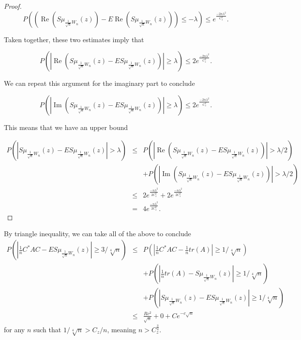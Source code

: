 \documentclass[12pt,a4paper,leqno]{report}
\renewcommand{\Re}{\operatorname{Re}}
\renewcommand{\Im}{\operatorname{Im}}
\theoremstyle{plain}
\theoremstyle{definition}
\theoremstyle{remark}
\begin{document}
\begin{proof}
\begin{equation*}
P\left((\Re(S\mu_{\frac{1}{\sqrt{n}}W_n}(z))-E\Re(S\mu_{\frac{1}{\sqrt{n}}W_n}(z))) \leq  -\lambda \right) \leq
e^{\frac{-2n\lambda^2}{C_z^2}}.
\end{equation*}

Taken together, these two estimates imply that

\begin{equation*}
P\left(|\Re(S\mu_{\frac{1}{\sqrt{n}}W_n}(z)-ES\mu_{\frac{1}{\sqrt{n}}W_n}(z))| \geq  \lambda \right)  \leq 2
e^{\frac{-2n\lambda^2}{C_z^2}}.
\end{equation*}

We can repeat this argument for the imaginary part to conclude

\begin{equation*}
P\left(|\Im(S\mu_{\frac{1}{\sqrt{n}}W_n}(z)-ES\mu_{\frac{1}{\sqrt{n}}W_n}(z))| \geq  \lambda \right)  \leq 2
e^{\frac{-2n\lambda^2}{C_z^2}}.
\end{equation*}

This means that we have an upper bound

\begin{eqnarray*}
P(|S\mu_{\frac{1}{\sqrt{n}}W_n}(z)- ES\mu_{\frac{1}{\sqrt{n}}W_n}(z)|>\lambda) & \leq &
P(|\Re(S\mu_{\frac{1}{\sqrt{n}}W_n}(z)- ES\mu_{\frac{1}{\sqrt{n}}W_n}(z))|>\lambda/2) \\ & &+ 
P(|\Im(S\mu_{\frac{1}{\sqrt{n}}W_n}(z)- ES\mu_{\frac{1}{\sqrt{n}}W_n}(z))|>\lambda/2)\\
& \leq & 2
e^{\frac{-n\lambda^2}{2C_z^2}} + 2
e^{\frac{-n\lambda^2}{2C_z^2}}\\
& = & 4
e^{\frac{-n\lambda^2}{2C_z^2}}.
\end{eqnarray*}

\end{proof}

By triangle inequality, we can take all of the above to conclude
\begin{eqnarray*}
P(|\frac{1}{n}C^* A C - ES\mu_{\frac{1}{\sqrt{n}}W_n}(z)| \geq 3 /\sqrt[4]{n}) & \leq &
P(|\frac{1}{n}C^* A C - \frac{1}{n}tr(A)| \geq 1/\sqrt[4]{n})\\
& & + P(|\frac{1}{n}tr(A) - S\mu_{\frac{1}{\sqrt{n}}W_n}(z)| \geq 1/\sqrt[4]{n})\\
& & + P(|S\mu_{\frac{1}{\sqrt{n}}W_n}(z) - ES\mu_{\frac{1}{\sqrt{n}}W_n}(z)| \geq 1/\sqrt[4]{n})\\
& \leq &
\frac{Rc^2}{\sqrt{n}}+0+ Ce^{-c\sqrt{n}}
\end{eqnarray*}
for any $n$ such that $1/\sqrt[4]{n} > C_z/n$, meaning $n>C_z^{\frac{3}{4}}$.
\end{document}
